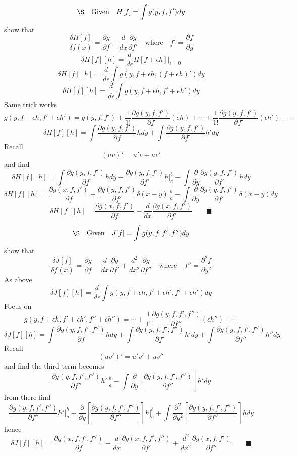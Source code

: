 \documentclass{memoir}
\begin{document}
\[\S\qq{Given}H[f]=\int g(y,f,f')dy\]
show that \[\frac{\delta H[f]}{\delta f(x)}=\frac{\partial g}{\partial f} -\frac{d}{dx}\frac{\partial g}{\partial f'} \quad\text{where}\quad f'=\frac{\partial f}{\partial y}\]
\[\delta H[f][h]=\frac{d}{d\epsilon}H[f+\epsilon h]\Big\vert_{\epsilon=0}\]
\[\delta H[f][h]=\frac{d}{d\epsilon}\int g(y,f+\epsilon h,(f+\epsilon h)')dy\]
\[\delta H[f][h]=\frac{d}{d\epsilon}\int g\left(y,f+\epsilon h,f'+\epsilon h'\right)dy\]
Same trick works \[g(y,f+\epsilon h,f'+\epsilon h')=g(y,f,f')+\frac{1}{1!}\frac{\partial g(y,f,f')}{\partial f}(\epsilon h) + \cdots +\frac{1}{1!}\frac{\partial g(y,f,f')}{\partial f'}(\epsilon h') + \cdots \]
\[\delta H[f][h]=\int\frac{\partial g(y,f,f')}{\partial f}hdy+\int\frac{\partial g(y,f,f')}{\partial f' }h'dy\] Recall \[(uv)'=u'v+uv'\] and find
\[\delta H[f][h]=\int\frac{\partial g(y,f,f')}{\partial f}hdy+\frac{\partial g(y,f,f')}{\partial f'}h\Big \vert_a^b-\int\frac{\partial}{\partial y}\frac{\partial g(y,f,f')}{\partial f'}hdy\]
\[\delta H[f][h]=\frac{\partial g(x,f,f')}{\partial f}+\frac{\partial g(y,f,f')}{\partial f'}\delta(x-y)\Big \vert_a^b-\int\frac{\partial}{\partial y}\frac{\partial g(y,f,f')}{\partial f'}\delta(x-y)dy\]
\[\delta H[f][h]=\frac{\partial g(x,f,f')}{\partial f}-\frac{d}{dx}\frac{\partial g(x,f,f')}{\partial f'} \qquad \blacksquare\]

\[\S\qq{Given}J[f]=\int g(y,f,f',f'')dy\]
show that \[\frac{\delta J[f]}{\delta f(x)}=\frac{\partial g}{\partial f} -\frac{d}{dx}\frac{\partial g}{\partial f'}+\frac{d^2}{dx^2}\frac{\partial g}{\partial f''} \quad\text{where}\quad f''=\frac{\partial^2 f}{\partial y^2}\]
As above \[\delta J[f][h]=\frac{d}{d\epsilon}\int g\left(y,f+\epsilon h,f'+\epsilon h',f'+\epsilon h'\right)dy\]
Focus on \[g(y,f+\epsilon h,f'+\epsilon h',f''+\epsilon h'')= \cdots +\frac{1}{1!}\frac{\partial g(y,f,f',f'')}{\partial f''}(\epsilon h'') + \cdots \]
\[\delta J[f][h]=\int\frac{\partial g(y,f,f',f'')}{\partial f}hdy+\int\frac{\partial g(y,f,f',f'')}{\partial f'}h'dy+\int\frac{\partial g(y,f,f',f'')}{\partial f''}h''dy\] Recall \[(uv')'=u'v'+uv''\] and find the third term becomes
\[\frac{\partial g(y,f,f',f'')}{\partial f''}h'\Big \vert_a^b-\int\frac{\partial}{\partial y}\left[\frac{\partial g(y,f,f',f'')}{\partial f''}\right]h'dy\]
from there find
\[\frac{\partial g(y,f,f',f'')}{\partial f''}h'\Big \vert_a^b-\frac{\partial}{\partial y}\left[\frac{\partial g(y,f,f',f'')}{\partial f''}\right]h\Big \vert_a^b+\int\frac{\partial^2}{\partial y^2}\left[\frac{\partial g(y,f,f',f'')}{\partial f''}\right]hdy\]
hence
\[\delta J[f][h]=\frac{\partial g(x,f,f',f'')}{\partial f}-\frac{d}{dx}\frac{\partial g(x,f,f',f'')}{\partial f'}+\frac{d^2}{dx^2}\frac{\partial g(x,f,f')}{\partial f''} \qquad \blacksquare\]
\end{document}
